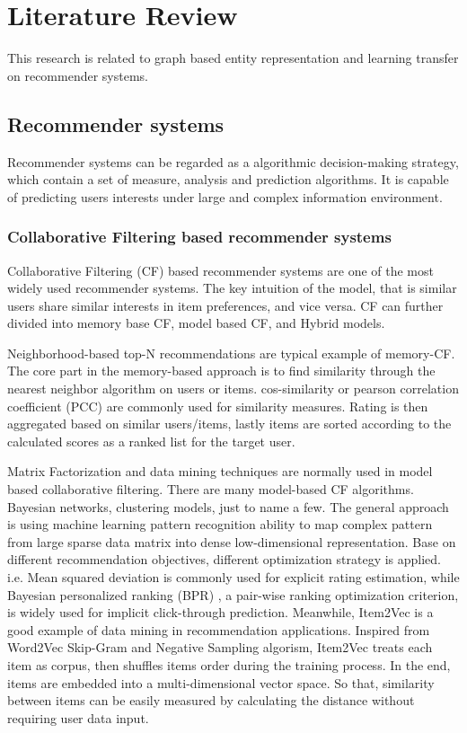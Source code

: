 \section{Literature Review}
This research is related to graph based entity representation and learning transfer on recommender systems.

\subsection{Recommender systems}
Recommender systems can be regarded as a algorithmic decision-making strategy, which contain a set of measure, analysis and prediction algorithms. It is capable of predicting users interests under large and complex information environment.

\bigskip
\subsubsection{Collaborative Filtering based recommender systems}
Collaborative Filtering (CF) based recommender systems are one of the most widely used recommender systems. The key intuition of the model, that is similar users share similar interests in item preferences, and vice versa. CF can further divided into memory base CF, model based CF, and Hybrid models.

Neighborhood-based top-N recommendations are typical example of memory-CF. The core part in the memory-based approach is to find similarity through the nearest neighbor algorithm on users or items. cos-similarity or pearson correlation coefficient (PCC) \citep{sarwar2001item} are commonly used for similarity measures. Rating is then aggregated based on similar users/items, lastly items are sorted according to the calculated scores as a ranked list for the target user. 

Matrix Factorization and data mining techniques are normally used in model based collaborative filtering. There are many model-based CF algorithms. Bayesian networks, clustering models, just to name a few. The general approach is using machine learning pattern recognition ability to map complex pattern from large sparse data matrix into dense low-dimensional representation. Base on different recommendation objectives, different optimization strategy is applied. i.e. Mean squared deviation is commonly used for explicit rating estimation, while Bayesian personalized ranking (BPR) \citep{rendle2012bpr}, a pair-wise ranking optimization criterion, is widely used for implicit click-through prediction.   
Meanwhile, Item2Vec \citep{barkan2016item2vec} is a good example of data mining in recommendation applications. Inspired from Word2Vec \citep{mikolov2013distributed} Skip-Gram and Negative Sampling algorism, Item2Vec treats each item as corpus, then shuffles items order during the training process. In the end, items are embedded into a multi-dimensional vector space. So that, similarity between items can be easily measured by calculating the distance without requiring user data input.  

